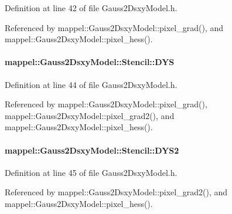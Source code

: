 Definition at line 42 of file Gauss2\+Dsxy\+Model.\+h.



Referenced by mappel\+::\+Gauss2\+Dsxy\+Model\+::pixel\+\_\+grad(), and mappel\+::\+Gauss2\+Dsxy\+Model\+::pixel\+\_\+hess().

\paragraph[{\texorpdfstring{D\+YS}{DYS}}]{ mappel\+::\+Gauss2\+Dsxy\+Model\+::\+Stencil\+::\+D\+YS}\hypertarget{classmappel_1_1Gauss2DsxyModel_1_1Stencil_a031aaa5d34ba2d3bcb9c553554660b9e}{}\label{classmappel_1_1Gauss2DsxyModel_1_1Stencil_a031aaa5d34ba2d3bcb9c553554660b9e}


Definition at line 44 of file Gauss2\+Dsxy\+Model.\+h.



Referenced by mappel\+::\+Gauss2\+Dsxy\+Model\+::pixel\+\_\+grad(), mappel\+::\+Gauss2\+Dsxy\+Model\+::pixel\+\_\+grad2(), and mappel\+::\+Gauss2\+Dsxy\+Model\+::pixel\+\_\+hess().

\paragraph[{\texorpdfstring{D\+Y\+S2}{DYS2}}]{ mappel\+::\+Gauss2\+Dsxy\+Model\+::\+Stencil\+::\+D\+Y\+S2}\hypertarget{classmappel_1_1Gauss2DsxyModel_1_1Stencil_aee79b44ae51dc400aa2074e88662fed9}{}\label{classmappel_1_1Gauss2DsxyModel_1_1Stencil_aee79b44ae51dc400aa2074e88662fed9}


Definition at line 45 of file Gauss2\+Dsxy\+Model.\+h.



Referenced by mappel\+::\+Gauss2\+Dsxy\+Model\+::pixel\+\_\+grad2(), and mappel\+::\+Gauss2\+Dsxy\+Model\+::pixel\+\_\+hess().

